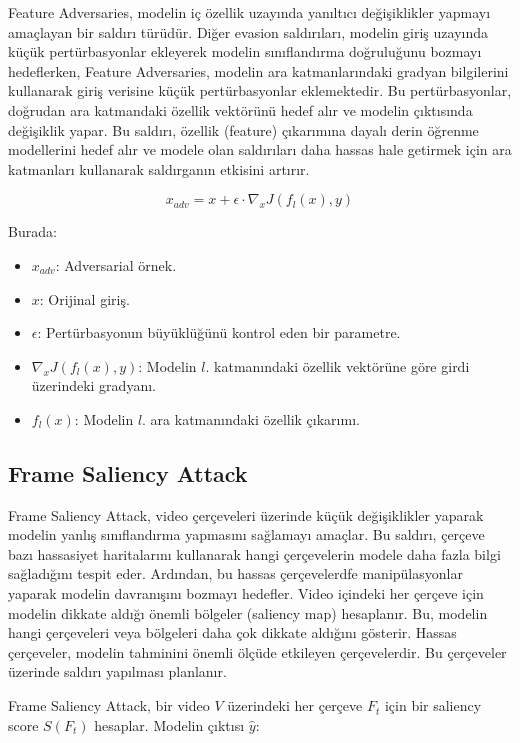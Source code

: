 Feature Adversaries, modelin iç özellik uzayında yanıltıcı değişiklikler yapmayı amaçlayan bir saldırı türüdür. Diğer evasion saldırıları, modelin giriş uzayında küçük pertürbasyonlar ekleyerek modelin sınıflandırma doğruluğunu bozmayı hedeflerken, Feature Adversaries, modelin ara katmanlarındaki gradyan bilgilerini kullanarak giriş verisine küçük pertürbasyonlar eklemektedir. Bu pertürbasyonlar, doğrudan ara katmandaki özellik vektörünü hedef alır ve modelin çıktısında değişiklik yapar. Bu saldırı, özellik (feature) çıkarımına dayalı derin öğrenme modellerini hedef alır ve modele olan saldırıları daha hassas hale getirmek için ara katmanları kullanarak saldırganın etkisini artırır.

\[ x_{adv} = x + \epsilon \cdot \nabla_x J(f_l(x), y) \]

Burada:

\begin{itemize}
    \item $x_{adv}$: Adversarial örnek.
    \item $x$: Orijinal giriş.
    \item $\epsilon$: Pertürbasyonun büyüklüğünü kontrol eden bir parametre.
    \item $\nabla_x J(f_l(x), y)$: Modelin $l$. katmanındaki özellik vektörüne göre girdi üzerindeki gradyanı.
    \item $f_l(x)$: Modelin $l$. ara katmanındaki özellik çıkarımı.
\end{itemize}

\newpage

\subsection{Frame Saliency Attack}

Frame Saliency Attack, video çerçeveleri üzerinde küçük değişiklikler yaparak modelin yanlış sınıflandırma yapmasını sağlamayı amaçlar. Bu saldırı, çerçeve bazı hassasiyet haritalarını kullanarak hangi çerçevelerin modele daha fazla bilgi sağladığını tespit eder. Ardından, bu hassas çerçevelerdfe manipülasyonlar yaparak modelin davranışını bozmayı hedefler. Video içindeki her çerçeve için modelin dikkate aldığı önemli bölgeler (saliency map) hesaplanır. Bu, modelin hangi çerçeveleri veya bölgeleri daha çok dikkate aldığını gösterir. Hassas çerçeveler, modelin tahminini önemli ölçüde etkileyen çerçevelerdir. Bu çerçeveler üzerinde saldırı yapılması planlanır.

Frame Saliency Attack, bir video $V$ üzerindeki her çerçeve $F_t$ için bir saliency score $S(F_t)$ hesaplar. Modelin çıktısı $\hat{y}$:

